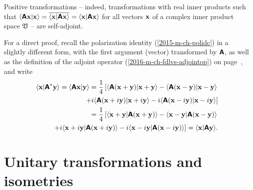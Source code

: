 Positive transformations -- indeed, transformations with real inner products such that
$
\langle \textsf{\textbf{A}} {\bf x}\vert {\bf x}\rangle
= \overline{\langle {\bf x}\vert \textsf{\textbf{A}}{\bf x}\rangle }
=
\langle {\bf x}\vert \textsf{\textbf{A}}{\bf x}\rangle$
for all vectors  ${\bf x}$
of a complex inner product space ${\frak V}$ --
are self-adjoint.

{%
For a direct proof,
recall the
polarization identity
(\ref{2015-m-ch-polidc})  in a slightly different form, with the first argument (vector) transformed by $\textsf{\textbf{A}}$,
as well as the definition of the adjoint operator (\ref{2016-m-ch-fdlvs-adjointop})
on page~\pageref{2016-m-ch-fdlvs-adjointop},
and write
\begin{equation}
\begin{split}
\langle {\bf x}\vert \textsf{\textbf{A}}^\ast {\bf y}\rangle
=
\langle \textsf{\textbf{A}} {\bf x}\vert {\bf y}\rangle
=
\frac{1}{4}\left[
\langle \textsf{\textbf{A}} ({\bf x}+ {\bf y}) \vert {\bf x}+ {\bf y}\rangle
-
\langle \textsf{\textbf{A}}({\bf x}- {\bf y}) \vert {\bf x}- {\bf y}\rangle \right.  \\
\left.
+ i
\langle \textsf{\textbf{A}} ({\bf x}+ i{\bf y}) \vert {\bf x}+ i{\bf y}\rangle
- i
\langle \textsf{\textbf{A}} ({\bf x}- i{\bf y}) \vert {\bf x} -i {\bf y}\rangle
\right]
\\
=
\frac{1}{4}\left[
\langle {\bf x}+ {\bf y} \vert \textsf{\textbf{A}} ({\bf x}+ {\bf y})\rangle
-
\langle {\bf x}- {\bf y} \vert \textsf{\textbf{A}}({\bf x}- {\bf y})\rangle \right.  \\
\left.
+ i
\langle {\bf x}+ i{\bf y} \vert \textsf{\textbf{A}} ({\bf x}+ i{\bf y})\rangle
- i
\langle {\bf x}- i{\bf y} \vert \textsf{\textbf{A}} ({\bf x} -i {\bf y})\rangle
\right]
=
\langle {\bf x}\vert \textsf{\textbf{A}}{\bf y}\rangle
.
\end{split}
\label{2015-m-ch-polidrv}
\end{equation}
}




\section{Unitary transformations and isometries}
\label{2014-m-ch-fdvs-unitary}


